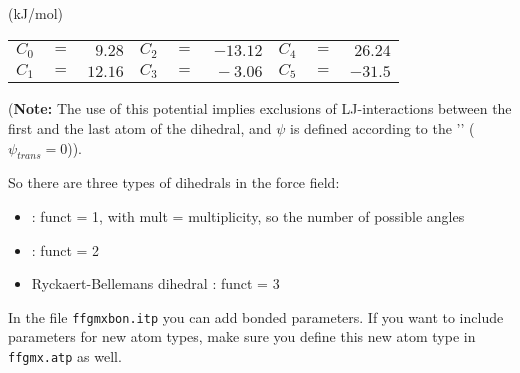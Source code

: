 \begin{center}
(kJ/mol)\\
\begin{tabular}{llrllrllr}
$C_0$ & $=$ & $~ 9.28$ & $C_2$ & $=$ & $-13.12$ & $C_4$ & $=$ & $ 26.24$ \\
$C_1$ & $=$ & $ 12.16$ & $C_3$ & $=$ & $~-3.06$ & $C_5$ & $=$ & $-31.5 $ \\
\end{tabular}
\end{center}

({\bf Note:} The use of this potential implies exclusions of LJ-interactions
between the first and the last atom of the dihedral, and $\psi$ is defined
according to the '' ($\psi_{trans}=0$)).

So there are three types of dihedrals in the {\gromacs} force field:
\begin{itemize}
\item {} : funct = 1, with mult = multiplicity, so the
                                   number of possible angles
\item {} : funct = 2
\item Ryckaert-Bellemans dihedral : funct = 3
\end{itemize}
In the file \verb'ffgmxbon.itp' you can add bonded parameters. If you
want to include parameters for new atom types, make sure you define
this new atom type in \verb'ffgmx.atp' as well.

